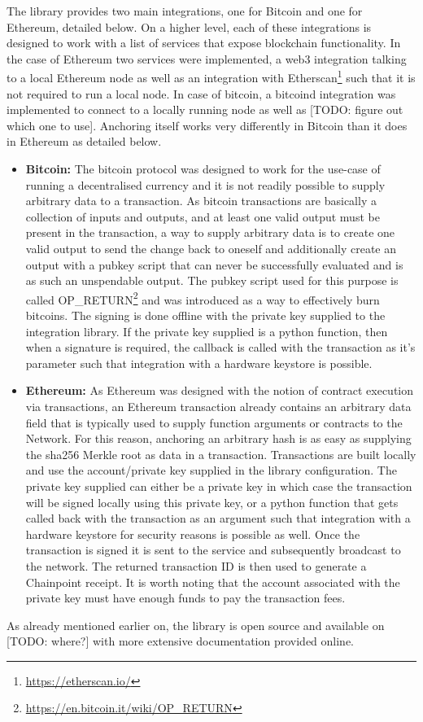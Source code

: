 \documentclass[12pt,msc,a4paper,oneside]{ucl_thesis}
\begin{document}
The library provides two main integrations, one for Bitcoin and one for Ethereum, detailed below. On a higher level, each of these integrations is designed to work with a list of services that expose blockchain functionality. In the case of Ethereum two services were implemented, a web3 integration talking to a local Ethereum node as well as an integration with Etherscan\footnote{\url{https://etherscan.io/}} such that it is not required to run a local node. In case of bitcoin, a bitcoind integration was implemented to connect to a locally running node as well as [TODO: figure out which one to use]. Anchoring itself works very differently in Bitcoin than it does in Ethereum as detailed below.
\begin{itemize}
    \item \textbf{Bitcoin:} The bitcoin protocol was designed to work for the use-case of running a decentralised currency and it is not readily possible to supply arbitrary data to a transaction. As bitcoin transactions are basically a collection of inputs and outputs, and at least one valid output must be present in the transaction, a way to supply arbitrary data is to create one valid output to send the change back to oneself and additionally create an output with a pubkey script that can never be successfully evaluated and is as such an unspendable output. The pubkey script used for this purpose is called OP\_RETURN\footnote{\url{https://en.bitcoin.it/wiki/OP_RETURN}} and was introduced as a way to effectively burn bitcoins. The signing is done offline with the private key supplied to the integration library. If the private key supplied is a python function, then when a signature is required, the callback is called with the transaction as it's parameter such that integration with a hardware keystore is possible.

    \item \textbf{Ethereum:} As Ethereum was designed with the notion of contract execution via transactions, an Ethereum transaction already contains an arbitrary data field that is typically used to supply function arguments or contracts to the Network. For this reason, anchoring an arbitrary hash is as easy as supplying the sha256 Merkle root as data in a transaction. Transactions are built locally and use the account/private key supplied in the library configuration. The private key supplied can either be a private key in which case the transaction will be signed locally using this private key, or a python function that gets called back with the transaction as an argument such that integration with a hardware keystore for security reasons is possible as well. Once the transaction is signed it is sent to the service and subsequently broadcast to the network. The returned transaction ID is then used to generate a Chainpoint receipt. It is worth noting that the account associated with the private key must have enough funds to pay the transaction fees.
\end{itemize}
As already mentioned earlier on, the library is open source and available on [TODO: where?] with more extensive documentation provided online.
\end{document}
